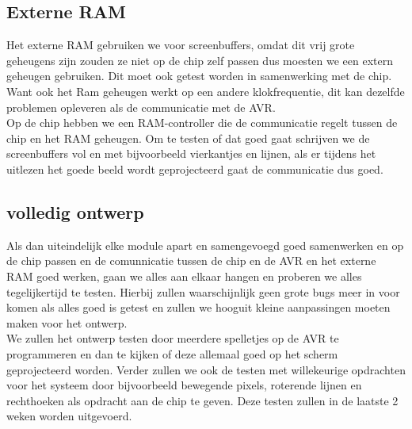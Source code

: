 \documentclass{scrartcl} %
\begin{document}
\subsection{Externe RAM}

Het externe RAM gebruiken we voor screenbuffers, omdat dit vrij grote geheugens zijn zouden ze niet op de chip zelf passen dus moesten we een extern geheugen gebruiken. Dit moet ook getest worden in samenwerking met de chip. Want ook het Ram 
geheugen werkt op een andere klokfrequentie, dit kan dezelfde problemen opleveren als de communicatie met de AVR.\\ Op de chip hebben we een RAM-controller die de communicatie regelt tussen de chip en het RAM geheugen. Om te testen of dat goed gaat schrijven
we de screenbuffers vol en met bijvoorbeeld vierkantjes en lijnen, als er tijdens het uitlezen het goede beeld wordt geprojecteerd gaat de communicatie dus goed.


\subsection{volledig ontwerp}

Als dan uiteindelijk elke module apart en samengevoegd goed samenwerken en op de chip passen en de comunnicatie tussen de chip en de AVR en het externe RAM goed werken, gaan we alles aan elkaar hangen en proberen we alles tegelijkertijd te testen. 
Hierbij zullen waarschijnlijk geen grote bugs meer in voor komen als alles goed is getest en zullen we hooguit kleine aanpassingen moeten maken voor het ontwerp.\\ We zullen het ontwerp testen door meerdere spelletjes op de AVR te programmeren en dan te kijken 
of deze allemaal goed op het scherm geprojecteerd worden. Verder zullen we ook de testen met willekeurige opdrachten voor het systeem door bijvoorbeeld bewegende pixels, roterende lijnen en rechthoeken als opdracht aan de chip te geven. Deze testen zullen in de laatste 2 weken worden uitgevoerd.
\end{document}
